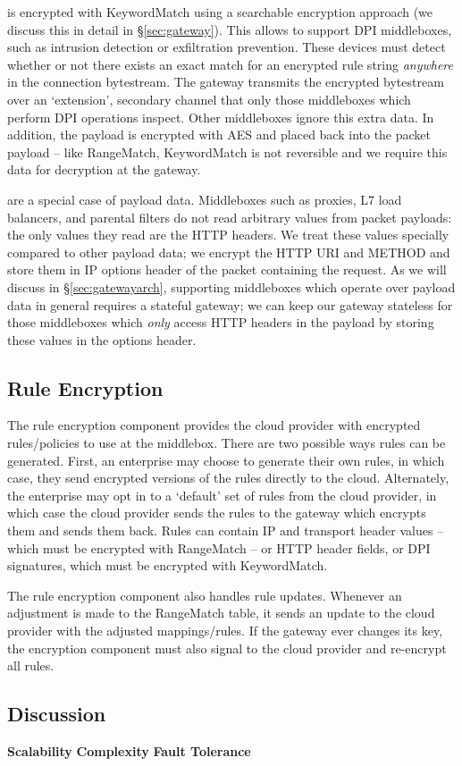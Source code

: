  is encrypted with KeywordMatch using a searchable encryption approach (we discuss this in detail in \S\ref{sec:gateway}). This allows \sys to support DPI middleboxes, such as intrusion detection or exfiltration prevention.
These devices must detect whether or not there exists an exact match for an encrypted rule string {\it anywhere} in the connection bytestream.
The gateway transmits the encrypted bytestream over an `extension', secondary channel that only those middleboxes which perform DPI operations inspect. 
Other middleboxes ignore this extra data.
In addition, the payload is encrypted with AES and placed back into the packet payload -- like RangeMatch, KeywordMatch is not reversible and we require this data for decryption at the gateway.

 are a special case of payload data.
Middleboxes such as proxies, L7 load balancers, and parental filters do not read arbitrary values from packet payloads: the only values they read are the HTTP headers.
We treat these values specially compared to other payload data; we encrypt the HTTP URI and METHOD and store them in IP options header of the packet containing the request.
As we will discuss in \S\ref{sec:gatewayarch}, supporting middleboxes which operate over payload data in general requires a stateful gateway; we can keep our gateway stateless for those middleboxes which {\it only} access HTTP headers in the payload by storing these values in the options header. 



\subsection{Rule Encryption}
\label{sec:rulenc}


The rule encryption component provides the cloud provider with encrypted rules/policies to use at the middlebox. 
There are two possible ways rules can be generated. First, an enterprise may choose to generate their own rules, in which case, they send encrypted versions of the rules directly to the cloud.
Alternately, the enterprise may opt in to a `default' set of rules from the cloud provider, in which case the cloud provider sends the rules to the gateway which encrypts them and sends them back.
Rules can contain IP and transport header values -- which must be encrypted with RangeMatch -- or HTTP header fields, or DPI signatures, which must be encrypted with KeywordMatch.

The rule encryption component also handles rule updates. 
Whenever an adjustment is made to the RangeMatch table, it sends an update to the cloud provider with the adjusted mappings/rules.
If the gateway ever changes its key, the encryption component must also signal to the cloud provider and re-encrypt all rules.


\subsection{Discussion}
\label{sec:gwdiscuss}
\textbf{Scalability}
\textbf{Complexity}
\textbf{Fault Tolerance}
